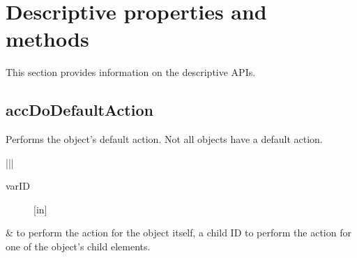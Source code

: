 \documentclass[letterpaper,12pt,english,openany,oneside]{sphinxmanual}
\begin{document}

\begin{sphinxVerbatim}[commandchars=\\\{\}]
\end{sphinxVerbatim}




\section{Descriptive properties and methods}
\label{\detokenize{MSAA_PDF:descriptive-properties-and-methods}}
This section provides information on the descriptive APIs.


\subsection{accDoDefaultAction}
\label{\detokenize{MSAA_PDF:accdodefaultaction}}
Performs the object’s default action. Not all objects have a default action.

\begin{sphinxVerbatim}[commandchars=\\\{\}]
  
\end{sphinxVerbatim}



\begin{savenotes}\sphinxattablestart
\centering
{}\label{\detokenize{MSAA_PDF:section-5}}\nobreak
\begin{tabular}[t]{|*{2}{|}}
\hline
\begin{description}
\item[{varID}] \leavevmode
{[}in{]}

\end{description}
&
 to perform the action for the object itself, a child ID to perform the action for one of the object’s child elements.
\\
\hline
\end{tabular}
\par
\sphinxattableend\end{savenotes}


\begin{sphinxVerbatim}[commandchars=\\\{\}]
\end{sphinxVerbatim}
\end{document}

